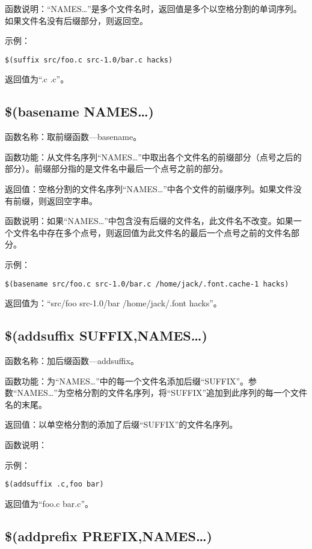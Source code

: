 函数说明：“NAMES…”是多个文件名时，返回值是多个以空格分割的单词序列。如果文件名没有后缀部分，则返回空。

示例：
\begin{Verbatim}[]
$(suffix src/foo.c src-1.0/bar.c hacks)
\end{Verbatim}

返回值为“.c .c”。

\subsection{\$(basename NAMES…)}

函数名称：取前缀函数—basename。

函数功能：从文件名序列“NAMES…”中取出各个文件名的前缀部分（点号之后的部分）。前缀部分指的是文件名中最后一个点号之前的部分。

返回值：空格分割的文件名序列“NAMES…”中各个文件的前缀序列。如果文件没有前缀，则返回空字串。

函数说明：如果“NAMES…”中包含没有后缀的文件名，此文件名不改变。如果一个文件名中存在多个点号，则返回值为此文件名的最后一个点号之前的文件名部分。

示例：
\begin{Verbatim}[]
$(basename src/foo.c src-1.0/bar.c /home/jack/.font.cache-1 hacks)
\end{Verbatim}

返回值为：“src/foo src-1.0/bar /home/jack/.font hacks”。

\subsection{\$(addsuffix SUFFIX,NAMES…)}

函数名称：加后缀函数—addsuffix。

函数功能：为“NAMES…”中的每一个文件名添加后缀“SUFFIX”。参数“NAMES…”为空格分割的文件名序列，将“SUFFIX”追加到此序列的每一个文件名的末尾。

返回值：以单空格分割的添加了后缀“SUFFIX”的文件名序列。

函数说明：

示例：
\begin{Verbatim}[]
$(addsuffix .c,foo bar)
\end{Verbatim}

返回值为“foo.c bar.c”。

\subsection{\$(addprefix PREFIX,NAMES…)}

